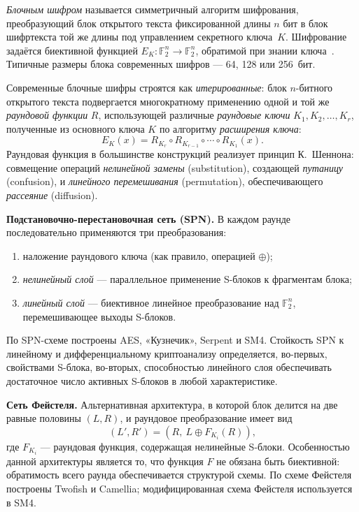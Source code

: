 \emph{Блочным шифром} называется симметричный алгоритм шифрования,
преобразующий блок открытого текста фиксированной длины $n$ бит в
блок шифртекста той же длины под управлением секретного ключа~$K$.
Шифрование задаётся биективной функцией
$E_K: \mathbb{F}_2^n \to \mathbb{F}_2^n$, обратимой при знании
ключа~\cite{alferov2002}. Типичные размеры блока современных шифров —
64, 128 или 256~бит.

Современные блочные шифры строятся как \emph{итерированные}: блок
$n$-битного открытого текста подвергается многократному применению
одной и той же \emph{раундовой функции} $R$, использующей различные
\emph{раундовые ключи} $K_1, K_2, \dots, K_r$, полученные из основного
ключа $K$ по алгоритму \emph{расширения ключа}:
\[
    E_K(x) = R_{K_r} \circ R_{K_{r-1}} \circ \cdots \circ R_{K_1}(x).
\]
Раундовая функция в большинстве конструкций реализует принцип
К.~Шеннона: совмещение операций \emph{нелинейной замены}
(substitution), создающей \emph{путаницу} (confusion), и
\emph{линейного перемешивания} (permutation), обеспечивающего
\emph{рассеяние} (diffusion).

\textbf{Подстановочно-перестановочная сеть (SPN).} В каждом раунде
последовательно применяются три преобразования:
\begin{enumerate}
    \item наложение раундового ключа (как правило, операцией $\oplus$);
    \item \emph{нелинейный слой} — параллельное применение S-блоков
        к фрагментам блока;
    \item \emph{линейный слой} — биективное линейное преобразование
        над $\mathbb{F}_2^n$, перемешивающее выходы S-блоков.
\end{enumerate}
По SPN-схеме построены AES, «Кузнечик», Serpent и SM4. Стойкость SPN
к линейному и дифференциальному криптоанализу определяется,
во-первых, свойствами S-блока, во-вторых, способностью линейного слоя
обеспечивать достаточное число активных S-блоков в любой
характеристике.

\textbf{Сеть Фейстеля.} Альтернативная архитектура, в которой блок
делится на две равные половины $(L, R)$, и раундовое преобразование
имеет вид
\[
    (L', R') = (R,\ L \oplus F_{K_i}(R)),
\]
где $F_{K_i}$ — раундовая функция, содержащая нелинейные S-блоки.
Особенностью данной архитектуры является то, что функция $F$ не обязана
быть биективной: обратимость всего раунда обеспечивается структурой
схемы. По схеме Фейстеля построены Twofish и Camellia; модифицированная
схема Фейстеля используется в SM4.

